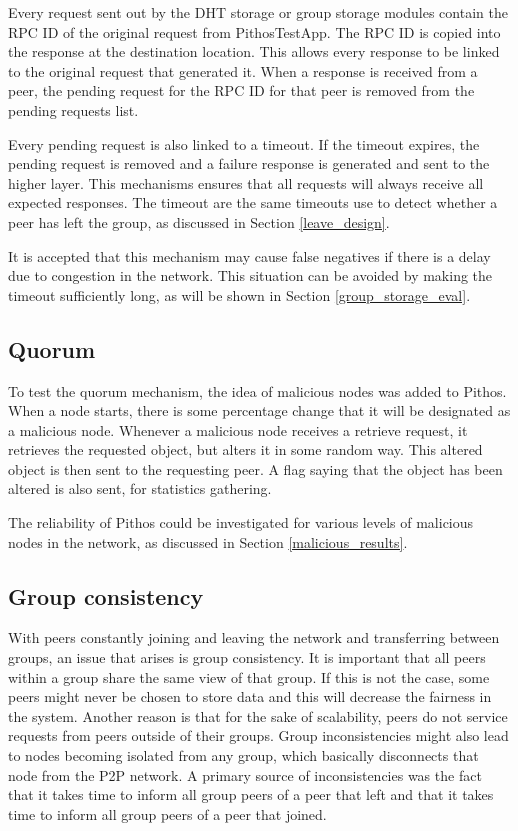 Every request sent out by the DHT storage or group storage modules contain the RPC ID of the original request from PithosTestApp. The RPC ID is copied into the response at the destination location. This allows every response to be linked to the original request that generated it. When a response is received from a peer, the pending request for the RPC ID for that peer is removed from the pending requests list.

Every pending request is also linked to a timeout. If the timeout expires, the pending request is removed and a failure response is generated and sent to the higher layer. This mechanisms ensures that all requests will always receive all expected responses. The timeout are the same timeouts use to detect whether a peer has left the group, as discussed in Section \ref{leave_design}.

It is accepted that this mechanism may cause false negatives if there is a delay due to congestion in the network. This situation can be avoided by making the timeout sufficiently long, as will be shown in Section \ref{group_storage_eval}.

\subsection{Quorum}
\label{object_verification_implementation}

To test the quorum mechanism, the idea of malicious nodes was added to Pithos. When a node starts, there is some percentage change that it will be designated as a malicious node. Whenever a malicious node receives a retrieve request, it retrieves the requested object, but alters it in some random way. This altered object is then sent to the requesting peer. A flag saying that the object has been altered is also sent, for statistics gathering.

The reliability of Pithos could be investigated for various levels of malicious nodes in the network, as discussed in Section \ref{malicious_results}.

\subsection{Group consistency}
\label{group_consistency_implementation}

With peers constantly joining and leaving the network and transferring between groups, an issue that arises is group consistency. It is important that all peers within a group share the same view of that group. If this is not the case, some peers might never be chosen to store data and this will decrease the fairness in the system. Another reason is that for the sake of scalability, peers do not service requests from peers outside of their groups. Group inconsistencies might also lead to nodes becoming isolated from any group, which basically disconnects that node from the P2P network. A primary source of inconsistencies was the fact that it takes time to inform all group peers of a peer that left and that it takes time to inform all group peers of a peer that joined.

